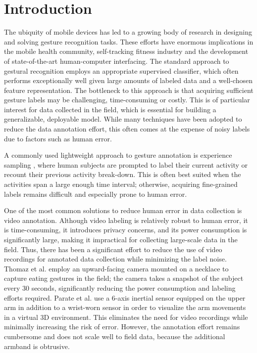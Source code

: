 \documentclass{sigchi}
\begin{document}

\section{Introduction}

The ubiquity of mobile devices has led to a growing body of research in designing and solving gesture recognition tasks. These efforts have enormous implications in the mobile health community, self-tracking fitness industry and the development of state-of-the-art human-computer interfacing. The standard approach to gestural recognition employs an appropriate supervised classifier, which often performs exceptionally well given large amounts of labeled data and a well-chosen feature representation. The bottleneck to this approach is that acquiring sufficient gesture labels may be challenging, time-consuming or costly. This is of particular interest for data collected in the field, which is essential for building a generalizable,  deployable model. While many techniques have been adopted to reduce the data annotation effort, this often comes at the expense of noisy labels due to factors such as human error.

A commonly used lightweight approach to gesture annotation is experience sampling \cite{Froehlich:2007:MSS:1247660.1247670}, where human subjects are prompted to label their current activity or recount their previous activity break-down. This is often best suited when the activities span a large enough time interval; otherwise, acquiring fine-grained labels remains difficult and especially prone to human error.

One of the most common solutions to reduce human error in data collection is video annotation. Although video labeling is relatively robust to human error, it is time-consuming, it introduces privacy concerns, and its power consumption is significantly large, making it impractical for collecting large-scale data in the field. Thus, there has been a significant effort to reduce the use of video recordings for annotated data collection while minimizing the label noise. Thomaz et al. \cite{Thomaz:2015} employ an upward-facing camera mounted on a necklace to capture eating gestures in the field; the camera takes a snapshot of the subject every 30 seconds, significantly reducing the power consumption and labeling efforts required. Parate et al. \cite{Parate:2014} use a 6-axis inertial sensor equipped on the upper arm in addition to a wrist-worn sensor in order to visualize the arm movements in a virtual 3D environment. This eliminates the need for video recordings while minimally increasing the risk of error. However, the annotation effort remains cumbersome and does not scale well to field data, because the additional armband is obtrusive.
\end{document}

